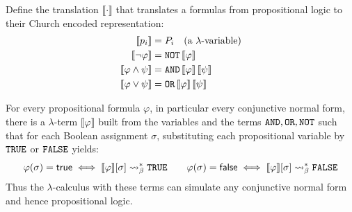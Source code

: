 \begin{definition} Define the translation $\llbracket\cdot\rrbracket$ that translates a formulas from propositional logic to their Church encoded representation:
  \label{def:proptocalc}
  \[
    \begin{aligned}
      \llbracket p_i\rrbracket &= P_i \quad(\text{a }\lambda\text{-variable})\\
      \llbracket \neg\varphi\rrbracket &= \texttt{NOT}\,\llbracket\varphi\rrbracket\\
      \llbracket \varphi\wedge\psi\rrbracket &= \texttt{AND}\,\llbracket\varphi\rrbracket\,\llbracket\psi\rrbracket\\
      \llbracket \varphi\vee\psi\rrbracket &= \texttt{OR}\,\llbracket\varphi\rrbracket\,\llbracket\psi\rrbracket
    \end{aligned}
  \]
\end{definition}

\begin{proposition}
  For every propositional formula $\varphi$, in particular every conjunctive normal form,
  there is a $\lambda$-term $\llbracket\varphi\rrbracket$ built from the
  variables and the terms $\texttt{AND},\texttt{OR},\texttt{NOT}$ such
  that for each Boolean assignment $\sigma$, substituting each propositional
  variable by $\texttt{TRUE}$ or $\texttt{FALSE}$ yields:
  \[
    \varphi(\sigma)=\mathsf{true}\iff \llbracket\varphi\rrbracket[\sigma]\mathrel{\leadsto}_\beta^* \texttt{TRUE}
    \qquad
    \varphi(\sigma)=\mathsf{false}\iff \llbracket\varphi\rrbracket[\sigma]\mathrel{\leadsto}_\beta^* \texttt{FALSE}
  \]
  Thus the $\lambda$-calculus with these terms can simulate any conjunctive normal form and
  hence propositional logic.
\end{proposition}

